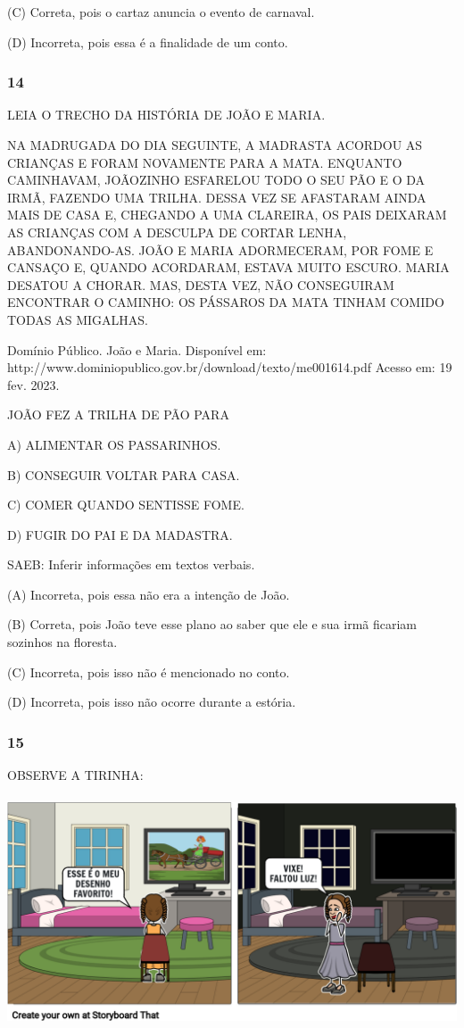 (C) Correta, pois o cartaz anuncia o evento de carnaval.

(D) Incorreta, pois essa é a finalidade de um conto. \protect\hypertarget{_heading=h.gluii2ldfhnb}{}{}

\subsubsection{14}\label{section-39}

LEIA O TRECHO DA HISTÓRIA DE JOÃO E MARIA.

NA MADRUGADA DO DIA SEGUINTE, A MADRASTA ACORDOU AS CRIANÇAS E FORAM
NOVAMENTE PARA A MATA. ENQUANTO CAMINHAVAM, JOÃOZINHO ESFARELOU TODO O
SEU PÃO E O DA IRMÃ, FAZENDO UMA TRILHA. DESSA VEZ SE AFASTARAM AINDA
MAIS DE CASA E, CHEGANDO A UMA CLAREIRA, OS PAIS DEIXARAM AS CRIANÇAS
COM A DESCULPA DE CORTAR LENHA, ABANDONANDO-AS. JOÃO E MARIA
ADORMECERAM, POR FOME E CANSAÇO E, QUANDO ACORDARAM, ESTAVA MUITO
ESCURO. MARIA DESATOU A CHORAR. MAS, DESTA VEZ, NÃO CONSEGUIRAM
ENCONTRAR O CAMINHO: OS PÁSSAROS DA MATA TINHAM COMIDO TODAS AS
MIGALHAS.

Domínio Público. João e Maria. Disponível
em: http://www.dominiopublico.gov.br/download/texto/me001614.pdf
Acesso em: 19 fev. 2023.

JOÃO FEZ A TRILHA DE PÃO PARA

A) ALIMENTAR OS PASSARINHOS.

B) CONSEGUIR VOLTAR PARA CASA.

C) COMER QUANDO SENTISSE FOME.

D) FUGIR DO PAI E DA MADASTRA.

SAEB: Inferir informações em textos verbais.

(A) Incorreta, pois essa não era a intenção de João.

(B) Correta, pois João teve esse plano ao saber que ele e sua irmã
ficariam sozinhos na floresta.

(C) Incorreta, pois isso não é mencionado no conto.

(D) Incorreta, pois isso não ocorre durante a estória.

\subsubsection{15}\label{section-40}

OBSERVE A TIRINHA:

\includegraphics[width=5.42742in,height=2.68116in]{media/image206.png}

